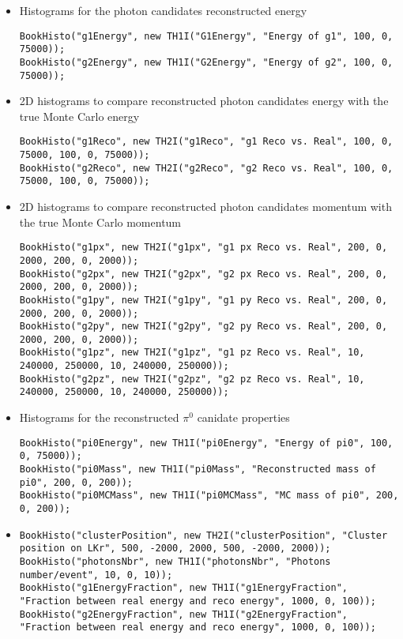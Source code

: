 \begin{itemize}
  \item Histograms for the photon candidates reconstructed energy 
\begin{lstlisting}
BookHisto("g1Energy", new TH1I("G1Energy", "Energy of g1", 100, 0, 75000));
BookHisto("g2Energy", new TH1I("G2Energy", "Energy of g2", 100, 0, 75000));
\end{lstlisting}
	\item 2D histograms to compare reconstructed photon candidates energy with the true Monte Carlo
	energy
\begin{lstlisting}
BookHisto("g1Reco", new TH2I("g1Reco", "g1 Reco vs. Real", 100, 0, 75000, 100, 0, 75000));
BookHisto("g2Reco", new TH2I("g2Reco", "g2 Reco vs. Real", 100, 0, 75000, 100, 0, 75000));
\end{lstlisting}
	\item 2D histograms to compare reconstructed photon candidates momentum with the true Monte Carlo
	momentum
\begin{lstlisting}
BookHisto("g1px", new TH2I("g1px", "g1 px Reco vs. Real", 200, 0, 2000, 200, 0, 2000));
BookHisto("g2px", new TH2I("g2px", "g2 px Reco vs. Real", 200, 0, 2000, 200, 0, 2000));
BookHisto("g1py", new TH2I("g1py", "g1 py Reco vs. Real", 200, 0, 2000, 200, 0, 2000));
BookHisto("g2py", new TH2I("g2py", "g2 py Reco vs. Real", 200, 0, 2000, 200, 0, 2000));
BookHisto("g1pz", new TH2I("g1pz", "g1 pz Reco vs. Real", 10, 240000, 250000, 10, 240000, 250000));
BookHisto("g2pz", new TH2I("g2pz", "g2 pz Reco vs. Real", 10, 240000, 250000, 10, 240000, 250000));
\end{lstlisting}
	\item Histograms for the reconstructed $\pi^0$ canidate properties
\begin{lstlisting}
BookHisto("pi0Energy", new TH1I("pi0Energy", "Energy of pi0", 100, 0, 75000));
BookHisto("pi0Mass", new TH1I("pi0Mass", "Reconstructed mass of pi0", 200, 0, 200));
BookHisto("pi0MCMass", new TH1I("pi0MCMass", "MC mass of pi0", 200, 0, 200));
\end{lstlisting}
	\item 
\begin{lstlisting}
BookHisto("clusterPosition", new TH2I("clusterPosition", "Cluster position on LKr", 500, -2000, 2000, 500, -2000, 2000));
BookHisto("photonsNbr", new TH1I("photonsNbr", "Photons number/event", 10, 0, 10));
BookHisto("g1EnergyFraction", new TH1I("g1EnergyFraction", "Fraction between real energy and reco energy", 1000, 0, 100));
BookHisto("g2EnergyFraction", new TH1I("g2EnergyFraction", "Fraction between real energy and reco energy", 1000, 0, 100));

\end{lstlisting}
\end{itemize}
